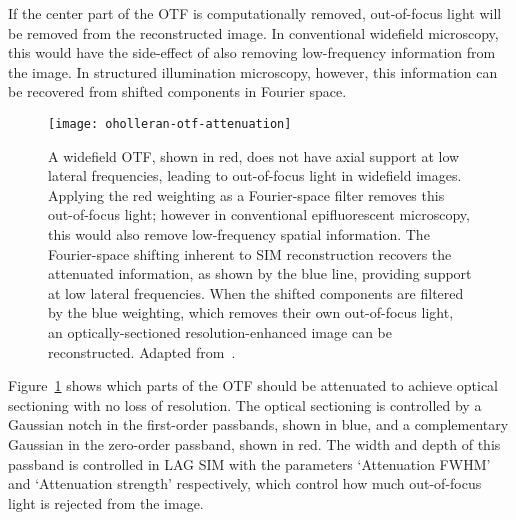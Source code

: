 If the center part of the OTF is computationally removed, out-of-focus light will be removed from the reconstructed image.
In conventional widefield microscopy, this would have the side-effect of also removing low-frequency information from the image.
In structured illumination microscopy, however, this information can be recovered from shifted components in Fourier space.

\begin{figure}[bp!]
\centering
\texttt{[image: oholleran-otf-attenuation]}
\caption[LAG SIM: OTF attenuation as part of the SIM reconstruction process removes out-of-focus light]{A widefield OTF, shown in red, does not have axial support at low lateral frequencies, leading to out-of-focus light in widefield images. Applying the red weighting as a Fourier-space filter removes this out-of-focus light; however in conventional epifluorescent microscopy, this would also remove low-frequency spatial information. The Fourier-space shifting inherent to SIM reconstruction recovers the attenuated information, as shown by the blue line, providing support at low lateral frequencies. When the shifted components are filtered by the blue weighting, which removes their own out-of-focus light, an optically-sectioned resolution-enhanced image can be reconstructed.  Adapted from~\cite{oholleran2014optimized}. }
\label{fig:oholleran-otf}
\end{figure}

Figure~\ref{fig:oholleran-otf} shows which parts of the OTF should be attenuated to achieve optical sectioning with no loss of resolution.
The optical sectioning is controlled by a Gaussian notch in the first-order passbands, shown in blue, and a complementary Gaussian in the zero-order passband, shown in red.
The width and depth of this passband is controlled in LAG SIM with the parameters `Attenuation FWHM' and `Attenuation strength' respectively, which control how much out-of-focus light is rejected from the image.

